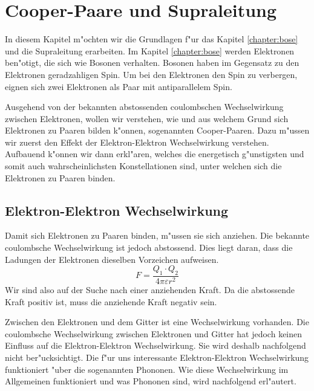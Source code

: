 \chapter{Cooper-Paare und Supraleitung\label{chapter:supraleitung}}
\begin{refsection}

In diesem Kapitel m"ochten wir die Grundlagen f"ur das Kapitel \ref{chapter:bose} und
die Supraleitung erarbeiten. Im Kapitel \ref{chapter:bose} werden Elektronen ben"otigt,
die sich wie Bosonen verhalten. Bosonen haben im Gegensatz zu den Elektronen
geradzahligen Spin. Um bei den Elektronen den Spin zu verbergen, eignen sich zwei Elektronen als Paar mit
antiparallelem Spin.

Ausgehend von der bekannten abstossenden coulombschen Wechselwirkung zwischen Elektronen,
wollen wir verstehen, wie und aus welchem Grund sich Elektronen zu Paaren bilden k"onnen,
sogenannten Cooper-Paaren.
Dazu m"ussen wir zuerst den Effekt der Elektron-Elektron Wechselwirkung verstehen.
Aufbauend k"onnen wir dann erkl"aren, welches die energetisch g"unstigsten und somit auch
wahrscheinlichsten Konstellationen sind, unter welchen sich die Elektronen zu Paaren binden.

\section{Elektron-Elektron Wechselwirkung\label{supraleitung:elektronelektronwechselwirkung}}
Damit sich Elektronen zu Paaren binden, m"ussen sie sich anziehen.
Die bekannte coulombsche Wechselwirkung ist jedoch abstossend.
Dies liegt daran, dass die Ladungen der Elektronen dieselben Vorzeichen aufweisen.
\begin{equation}
F = \frac{Q_1\cdot Q_2}{4\pi \varepsilon r^2}
\label{supraleitung:Coulomb}
\end{equation}
Wir sind also auf der Suche nach einer anziehenden Kraft.
Da die abstossende Kraft positiv ist, muss die anziehende Kraft negativ sein.

Zwischen den Elektronen und dem Gitter ist eine Wechselwirkung vorhanden.
Die coulombsche Wechselwirkung zwischen Elektronen und Gitter hat jedoch keinen Einfluss auf die
Elektron-Elektron Wechselwirkung.
Sie wird deshalb nachfolgend nicht ber"ucksichtigt.
Die f"ur uns interessante Elektron-Elektron Wechselwirkung funktioniert "uber die sogenannten Phononen.
Wie diese Wechselwirkung im Allgemeinen funktioniert und was Phononen sind, wird nachfolgend erl"autert.


\end{refsection}
